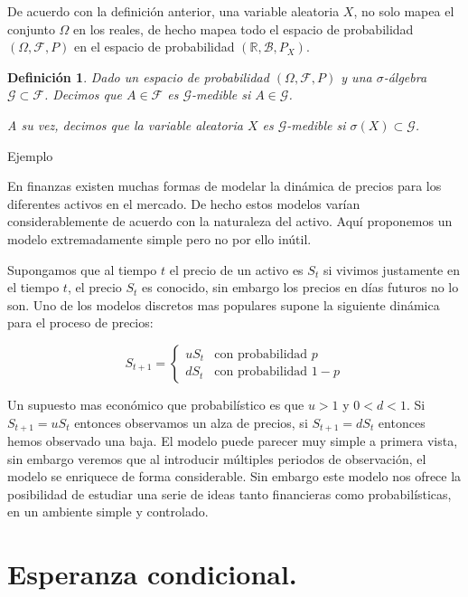 \documentclass{extreport}
\theoremstyle{definicion}
\newtheorem{definition}{Definición}[chapter]
\theoremstyle{propiedad}
\theoremstyle{teorema}
\begin{document}
De acuerdo con la definición anterior, una variable aleatoria $X$, no solo mapea el conjunto $\Omega$ en los reales, de hecho mapea todo el espacio de probabilidad $(\Omega, \mathcal{F}, P)$ en el espacio de probabilidad $(\mathbb{R}, \mathcal{B}, P_X)$. 

\begin{definition}
    Dado un espacio de probabilidad $(\Omega, \mathcal{F}, P)$ y una $\sigma$-álgebra $\mathcal{G}\subset\mathcal{F}$. Decimos que $A\in\mathcal{F}$ es \emph{$\mathcal{G}$-medible} si $A\in\mathcal{G}$. 

     A su vez, decimos que la variable aleatoria $X$ es $\mathcal{G}$-medible si $\sigma(X)\subset\mathcal{G}$. 
\end{definition}




Ejemplo

En finanzas existen muchas formas de modelar la dinámica de precios para los diferentes activos en el mercado. De hecho estos modelos varían considerablemente de acuerdo con la naturaleza del activo. Aquí proponemos un modelo extremadamente simple pero no por ello inútil.

Supongamos que al tiempo $t$ el precio de un activo es $S_t$   si vivimos justamente en el tiempo $t$, el precio $S_t$ es conocido, sin embargo los precios en días futuros no lo son. Uno de los modelos discretos mas populares supone la siguiente dinámica para el proceso de precios:

$$
S_{t+1} = \begin{cases}uS_t & \text{con probabilidad } p \\
dS_t & \text{con probabilidad } 1-p\end{cases}
$$

Un supuesto mas económico que probabilístico es que $u>1$ y $0< d < 1$.  Si $S_{t+1} = uS_t$ entonces observamos un alza de precios, si $S_{t+1} = dS_t$ entonces hemos observado una baja. El modelo puede parecer muy simple a primera vista, sin embargo veremos que al introducir múltiples periodos de observación, el modelo se enriquece de forma considerable. Sin embargo este modelo nos ofrece la posibilidad de estudiar una serie de ideas tanto financieras como probabilísticas, en un ambiente simple y controlado.

\section{Esperanza condicional.}
\end{document}
